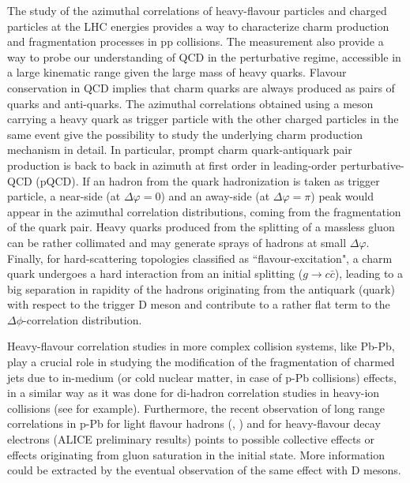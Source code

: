 
The study of the azimuthal correlations of heavy-flavour particles and charged particles at the LHC energies provides a way to characterize charm production and fragmentation processes in pp collisions. The measurement also provide a way to probe our understanding of QCD in the perturbative regime, accessible in a large kinematic range given the large mass of heavy quarks. Flavour conservation in QCD implies that charm quarks are always produced as pairs of quarks and anti-quarks. The azimuthal correlations obtained using a meson carrying a heavy quark as trigger particle with the other charged particles in the same event give the possibility to study the underlying charm production mechanism in detail. In particular, prompt charm quark-antiquark pair production is back to back in azimuth at first order in leading-order perturbative-QCD (pQCD). If an hadron from the quark hadronization is taken as trigger particle, a near-side (at $\Delta\varphi = 0$) and an away-side (at $\Delta\varphi = \pi$) peak would appear in the azimuthal correlation distributions, coming from the fragmentation of the quark pair. Heavy quarks produced from the splitting of a massless gluon can be rather collimated and may generate sprays of hadrons at small $\Delta\varphi$. Finally, for hard-scattering topologies classified as ``flavour-excitation", a charm quark undergoes a hard interaction from an initial splitting ($g\to c\bar{c}$), leading to a big separation in rapidity of the hadrons originating from the antiquark (quark) with respect to the trigger D meson and contribute to a rather flat term to the $\Delta\phi$-correlation distribution.

Heavy-flavour correlation studies in more complex collision systems, like Pb-Pb, play a crucial role in studying the modification of the fragmentation of charmed jets due to in-medium (or cold nuclear matter, in case of p-Pb collisions) effects, in a similar way as it was done for di-hadron correlation studies in heavy-ion collisions (see for example). Furthermore, the recent observation of long range correlations in p-Pb for light flavour hadrons (\cite{ALICEv2ppb}, \cite{ALICEv2ppb2}) and for heavy-flavour decay electrons (ALICE preliminary results) points to possible collective effects or effects originating from gluon saturation in the initial state. More information could be extracted by the eventual observation of the same effect with D mesons.\\

